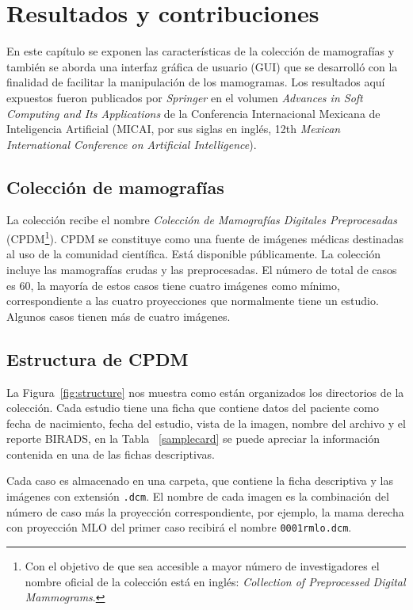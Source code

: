 \chapter{Resultados y contribuciones}
\label{resultados}

En este capítulo se exponen las características de la colección de mamografías
y también se aborda una interfaz gráfica de usuario (GUI) que se desarrolló con
la finalidad de facilitar la manipulación de los mamogramas. Los resultados
aquí expuestos fueron publicados por \textit{Springer} en el volumen
\textit{Advances in Soft Computing and Its Applications} de la 
Conferencia Internacional Mexicana de Inteligencia Artificial (MICAI, por sus
siglas en inglés, 12th \textit{Mexican International Conference on Artificial
Intelligence}).

\section{Colección de mamografías}

La colección recibe el nombre \textit{Colección de Mamografías Digitales
Preprocesadas} (CPDM\footnote{Con el objetivo de que sea accesible a mayor
número de investigadores el nombre oficial de la colección está en inglés:
\textit{Collection of Preprocessed Digital Mammograms}.}). CPDM se constituye
como una fuente de imágenes médicas destinadas al uso de la comunidad
científica. Está disponible públicamente. La colección incluye las mamografías
crudas y las preprocesadas. El número de total de casos es 60, la mayoría de
estos casos tiene cuatro imágenes como mínimo, correspondiente a las cuatro
proyecciones que normalmente tiene un estudio. Algunos casos tienen más de
cuatro imágenes.

\section{Estructura de CPDM}

La Figura~\ref{fig:structure} nos muestra como están organizados los
directorios de la colección. Cada estudio tiene una ficha que contiene datos
del paciente como fecha de nacimiento, fecha del estudio, vista de la imagen,
nombre del archivo y el reporte BIRADS, en la Tabla ~\ref{samplecard} se puede
apreciar la información contenida en una de las fichas descriptivas.

Cada caso es almacenado en una carpeta, que contiene la ficha descriptiva y las
imágenes con extensión \texttt{.dcm}. El nombre de cada imagen es la
combinación del número de caso más la proyección correspondiente, por ejemplo,
la mama derecha con proyección MLO del primer caso recibirá el nombre
\texttt{0001rmlo.dcm}.

